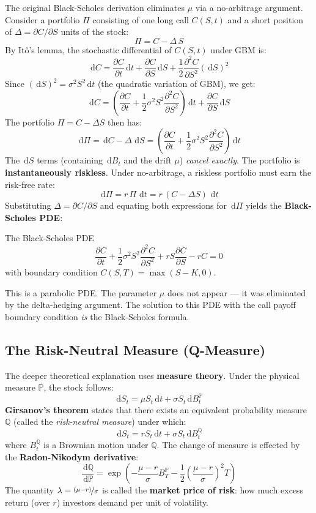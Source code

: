 \documentclass[12pt,a4paper,openany]{report}
\theoremstyle{definition}
\newcommand{\dd}{\,\mathrm{d}}
\begin{document}
The original Black-Scholes derivation eliminates $\mu$ via a no-arbitrage argument. Consider a portfolio $\Pi$ consisting of one long call $C(S,t)$ and a short position of $\Delta = \partial C/\partial S$ units of the stock:
\[
  \Pi = C - \Delta\, S
\]
By Itô's lemma, the stochastic differential of $C(S,t)$ under GBM is:
\[
  \dd C = \frac{\partial C}{\partial t}\dd t + \frac{\partial C}{\partial S}\dd S + \frac{1}{2}\frac{\partial^2 C}{\partial S^2}(\dd S)^2
\]
Since $(\dd S)^2 = \sigma^2 S^2 \dd t$ (the quadratic variation of GBM), we get:
\[
  \dd C = \left(\frac{\partial C}{\partial t} + \frac{1}{2}\sigma^2 S^2 \frac{\partial^2 C}{\partial S^2}\right)\dd t + \frac{\partial C}{\partial S}\dd S
\]
The portfolio $\Pi = C - \Delta S$ then has:
\[
  \dd\Pi = \dd C - \Delta\,\dd S = \left(\frac{\partial C}{\partial t} + \frac{1}{2}\sigma^2 S^2 \frac{\partial^2 C}{\partial S^2}\right)\dd t
\]
The $\dd S$ terms (containing $\dd B_t$ and the drift $\mu$) \emph{cancel exactly}. The portfolio is \textbf{instantaneously riskless}. Under no-arbitrage, a riskless portfolio must earn the risk-free rate:
\[
  \dd\Pi = r\,\Pi\,\dd t = r\,(C - \Delta S)\,\dd t
\]
Substituting $\Delta = \partial C/\partial S$ and equating both expressions for $\dd\Pi$ yields the \textbf{Black-Scholes PDE}:

\begin{definitionbox}{The Black-Scholes PDE}
\[
  \frac{\partial C}{\partial t} + \frac{1}{2}\sigma^2 S^2 \frac{\partial^2 C}{\partial S^2} + r S \frac{\partial C}{\partial S} - rC = 0
\]
with boundary condition $C(S, T) = \max(S - K, 0)$.

This is a parabolic PDE. The parameter $\mu$ does not appear — it was eliminated by the delta-hedging argument. The solution to this PDE with the call payoff boundary condition \emph{is} the Black-Scholes formula.
\end{definitionbox}

\subsection{The Risk-Neutral Measure (Q-Measure)}

The deeper theoretical explanation uses \textbf{measure theory}. Under the physical measure $\mathbb{P}$, the stock follows:
\[
  \dd S_t = \mu S_t \dd t + \sigma S_t \dd B_t^{\mathbb{P}}
\]
\textbf{Girsanov's theorem} states that there exists an equivalent probability measure $\mathbb{Q}$ (called the \emph{risk-neutral measure}) under which:
\[
  \dd S_t = r S_t \dd t + \sigma S_t \dd B_t^{\mathbb{Q}}
\]
where $B_t^{\mathbb{Q}}$ is a Brownian motion under $\mathbb{Q}$. The change of measure is effected by the \textbf{Radon-Nikodym derivative}:
\[
  \frac{\dd\mathbb{Q}}{\dd\mathbb{P}} = \exp\!\left(-\frac{\mu - r}{\sigma}B_T^{\mathbb{P}} - \frac{1}{2}\left(\frac{\mu-r}{\sigma}\right)^2 T\right)
\]
The quantity $\lambda = \nicefrac{(\mu - r)}{\sigma}$ is called the \textbf{market price of risk}: how much excess return (over $r$) investors demand per unit of volatility.
\end{document}
